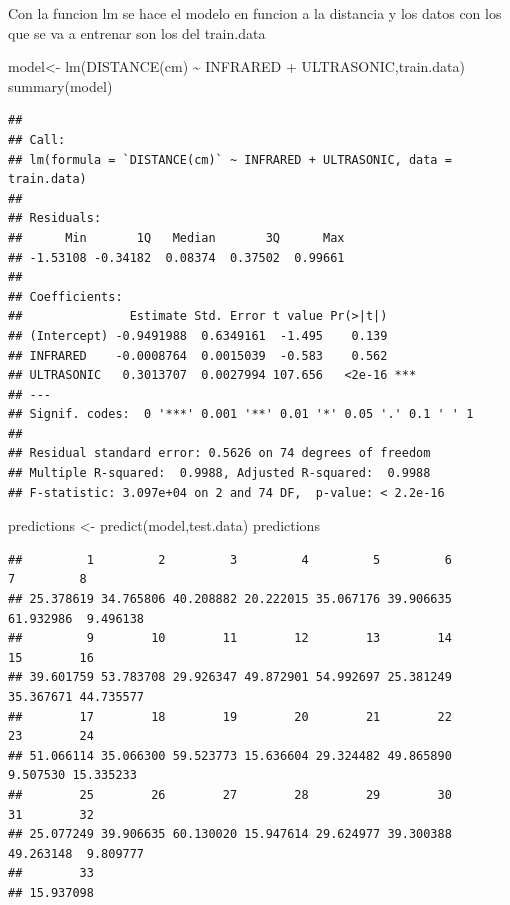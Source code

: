 \documentclass[
]{article}
\newenvironment{Shaded}{\begin{snugshade}}{\end{snugshade}}
\newcommand{\AttributeTok}[1]{\textcolor[rgb]{0.77,0.63,0.00}{#1}}
\newcommand{\FunctionTok}[1]{\textcolor[rgb]{0.00,0.00,0.00}{#1}}
\newcommand{\NormalTok}[1]{#1}
\newcommand{\OtherTok}[1]{\textcolor[rgb]{0.56,0.35,0.01}{#1}}
\newcommand{\SpecialCharTok}[1]{\textcolor[rgb]{0.00,0.00,0.00}{#1}}
\newcommand{\StringTok}[1]{\textcolor[rgb]{0.31,0.60,0.02}{#1}}
\begin{document}
Con la funcion lm se hace el modelo en funcion a la distancia y los
datos con los que se va a entrenar son los del train.data

\begin{Shaded}
\begin{Highlighting}[]
\NormalTok{model}\OtherTok{\textless{}{-}} \FunctionTok{lm}\NormalTok{(}\StringTok{\textasciigrave{}}\AttributeTok{DISTANCE(cm)}\StringTok{\textasciigrave{}} \SpecialCharTok{\textasciitilde{}}\NormalTok{ INFRARED }\SpecialCharTok{+}\NormalTok{ ULTRASONIC,train.data)}
\FunctionTok{summary}\NormalTok{(model)}
\end{Highlighting}
\end{Shaded}

\begin{verbatim}
## 
## Call:
## lm(formula = `DISTANCE(cm)` ~ INFRARED + ULTRASONIC, data = train.data)
## 
## Residuals:
##      Min       1Q   Median       3Q      Max 
## -1.53108 -0.34182  0.08374  0.37502  0.99661 
## 
## Coefficients:
##               Estimate Std. Error t value Pr(>|t|)    
## (Intercept) -0.9491988  0.6349161  -1.495    0.139    
## INFRARED    -0.0008764  0.0015039  -0.583    0.562    
## ULTRASONIC   0.3013707  0.0027994 107.656   <2e-16 ***
## ---
## Signif. codes:  0 '***' 0.001 '**' 0.01 '*' 0.05 '.' 0.1 ' ' 1
## 
## Residual standard error: 0.5626 on 74 degrees of freedom
## Multiple R-squared:  0.9988, Adjusted R-squared:  0.9988 
## F-statistic: 3.097e+04 on 2 and 74 DF,  p-value: < 2.2e-16
\end{verbatim}

\begin{Shaded}
\begin{Highlighting}[]
\NormalTok{predictions }\OtherTok{\textless{}{-}} \FunctionTok{predict}\NormalTok{(model,test.data)}
\NormalTok{predictions}
\end{Highlighting}
\end{Shaded}

\begin{verbatim}
##         1         2         3         4         5         6         7         8 
## 25.378619 34.765806 40.208882 20.222015 35.067176 39.906635 61.932986  9.496138 
##         9        10        11        12        13        14        15        16 
## 39.601759 53.783708 29.926347 49.872901 54.992697 25.381249 35.367671 44.735577 
##        17        18        19        20        21        22        23        24 
## 51.066114 35.066300 59.523773 15.636604 29.324482 49.865890  9.507530 15.335233 
##        25        26        27        28        29        30        31        32 
## 25.077249 39.906635 60.130020 15.947614 29.624977 39.300388 49.263148  9.809777 
##        33 
## 15.937098
\end{verbatim}
\end{document}
